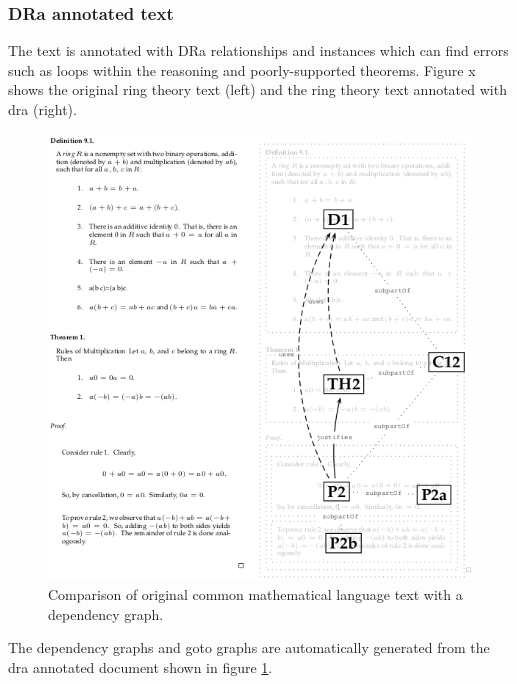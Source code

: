 \subsubsection{DRa annotated text}

The text is annotated with DRa relationships and instances which can find errors
such as loops within the reasoning and poorly-supported theorems. Figure x shows
the original ring theory text (left) and the ring theory text annotated with
\gls{dra} (right).

\begin{figure}[H]
\begin{center}
\includegraphics[scale=0.75]{Figures/Background/draforrings.png}
\end{center}
\caption{Comparison of original common mathematical language text with a
dependency graph.
 \label{fig:ringdra}}
\end{figure}

The dependency graphs and goto graphs are automatically generated from the
\gls{dra} annotated document shown in figure \ref{fig:ringdra}.

